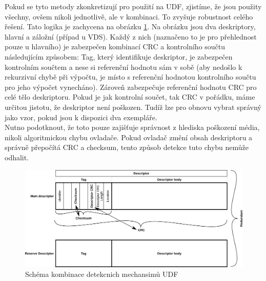 Pokud se tyto metody zkonkretizují pro použití na UDF, zjistíme, že jsou použity všechny, ovšem nikoli jednotlivě, ale v kombinaci. To zvyšuje robustnost celého řešení. Tato logika je zachycena na obrázku \ref{fig:detch}. Na obrázku jsou dva deskriptory, hlavní a záložní (případ u VDS). Každý z nich (naznačeno to je pro přehlednost pouze u hlavního) je zabezpečen kombinací CRC a kontrolního součtu následujícím způsobem: Tag, který identifikuje deskriptor, je zabezpečen kontrolním součtem a nese si referenční hodnotu sám v sobě (aby nedošlo k rekurzivní chybě při výpočtu, je místo s referenční hodnotou kontrolního součtu pro jeho výpočet vynecháno). Zároveň zabezpečuje referenční hodnotu CRC pro celé tělo deskriptoru. Pokud je  jak kontrolní součet, tak CRC v pořádku, máme určitou jistotu, že deskriptor není poškozen. Tudíž lze pro obnovu vybrat správný jako vzor, pokud jsou k dispozici dva exempláře.\\
Nutno podotknout, že toto pouze zajišťuje správnost z hlediska poškození média, nikoli algoritmickou chybu ovladače. Pokud ovladač změní obsah deskriptoru a správně přepočítá CRC a checksum, tento způsob detekce tuto chybu nemůže odhalit.
\begin{figure}[] 
    \centering
    \includegraphics[scale=0.65]{obrazky/det-chyb.png}
    \caption{Schéma kombinace detekcnich mechansimů UDF}
    \label{fig:detch}
\end{figure}

